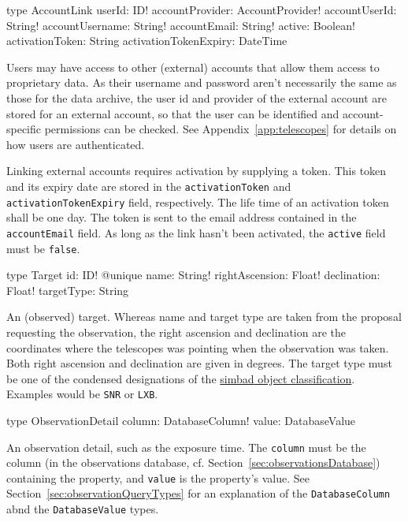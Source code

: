 \begin{code}
type AccountLink {
  userId: ID!
  accountProvider: AccountProvider!
  accountUserId: String!
  accountUsername: String!
  accountEmail: String!
  active: Boolean!
  activationToken: String
  activationTokenExpiry: DateTime
}
\end{code}

Users may have access to other (external) accounts that allow them access to proprietary data. As their username and password aren't necessarily the same as those for the data archive, the user id and provider of the external account are stored for an external account, so that the user can be identified and account-specific permissions can be checked. See Appendix~\ref{app:telescopes} for details on how users are authenticated.

Linking external accounts requires activation by supplying a token. This token and its expiry date are stored in the \verb|activationToken| and \verb|activationTokenExpiry| field, respectively. The life time of an activation token shall be one day. The token is sent to the email address contained in the \verb|accountEmail| field. As long as the link hasn't been activated, the \verb|active| field must be \verb|false|.


\begin{code}
type Target {
  id: ID! @unique
  name: String!
  rightAscension: Float!
  declination: Float!
  targetType: String
}
\end{code}

An (observed) target. Whereas name and target type are taken from the proposal requesting the observation, the right ascension and declination are the coordinates where the telescopes was pointing when the observation was taken. Both right ascension and declination are given in degrees. The target type must be one of the condensed designations of the \href{http://cds.u-strasbg.fr/cgi-bin/Otype?IR}{\Gls{simbad} object classification}. Examples would be \verb|SNR| or \verb|LXB|.


\begin{code}
type ObservationDetail {
  column: DatabaseColumn!
  value: DatabaseValue
}
\end{code}

An observation detail, such as the exposure time. The \verb|column| must be the column (in the observations database, cf. Section~\ref{sec:observationsDatabase}) containing the property, and \verb|value| is the property's value. See Section~\ref{sec:observationQueryTypes} for an explanation of the \verb|DatabaseColumn| abnd the \verb|DatabaseValue| types.

